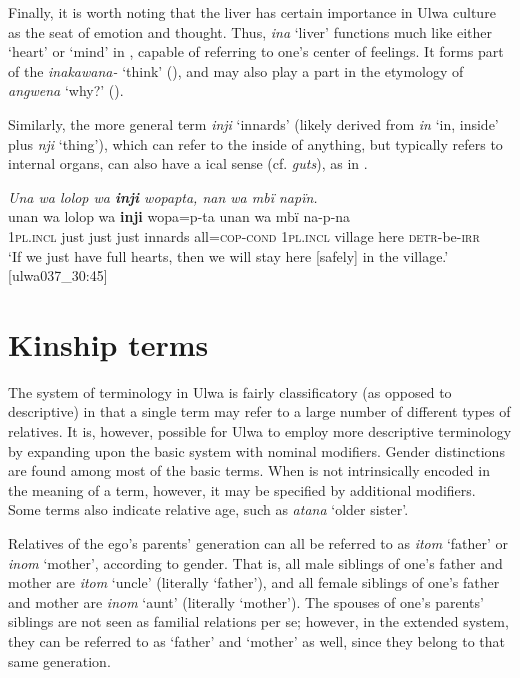 Finally, it is worth noting that the liver has certain importance in Ulwa culture as the seat of emotion and thought. Thus, \textit{ina} ‘liver’ functions much like either ‘heart’ or ‘mind’ in , capable of referring to one’s center of feelings. It forms part of the  \textit{inakawana-} ‘think’ (), and may also play a part in the etymology of \textit{angwena} ‘why?’ ().

  Similarly, the more general term \textit{inji} ‘innards’ (likely derived from \textit{in} ‘in, inside’ plus \textit{nji} ‘thing’), which can refer to the inside of anything, but typically refers to internal organs, can also have a ical sense (cf.  \textit{guts}), as in .


\ea%
    \label{ex:sem:21}
          \textit{Una wa lolop wa \textbf{inji} wopapta, nan wa mbï napïn.}\\
    \gll unan    wa  lolop  wa  \textbf{inji}      wopa=p-ta    unan wa    mbï  na-p-na\\
    1\textsc{pl.incl}  just  just    just  innards    all=\textsc{cop-cond}  \textsc{1pl.incl}    village  here  \textsc{detr}{}-be-\textsc{irr}\\
\glt `If we just have full hearts, then we will stay here [safely] in the village.’ [ulwa037\_30:45]
\z

\section{Kinship terms}\label{sec:14.7}


The system of  terminology in Ulwa is fairly  classificatory (as opposed to  descriptive) in that a single term may refer to a large number of different types of relatives. It is, however, possible for Ulwa to employ more descriptive terminology by expanding upon the basic system with nominal modifiers. Gender distinctions are found among most of the basic  terms. When  is not intrinsically encoded in the meaning of a  term, however, it may be specified by additional modifiers. Some  terms also indicate relative age, such as \textit{atana} ‘older sister’.

  Relatives of the ego’s parents’ generation can all be referred to as \textit{itom} ‘father’ or \textit{inom} ‘mother’, according to gender. That is, all male siblings of one’s father and mother are \textit{itom} ‘uncle’ (literally ‘father’), and all female siblings of one’s father and mother are \textit{inom} ‘aunt’ (literally ‘mother’). The spouses of one’s parents’ siblings are not seen as familial relations per se; however, in the extended  system, they can be referred to as ‘father’ and ‘mother’ as well, since they belong to that same generation.

